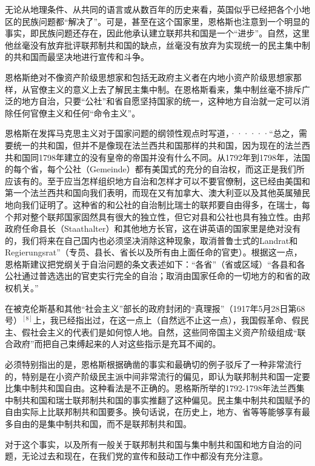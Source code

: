 无论从地理条件、从共同的语言或从数百年的历史来看，英国似乎已经把各个小地区的民族问题都“解决了”。可是，甚至在这个国家里，恩格斯也注意到一个明显的事实，即民族问题还存在，因此他承认建立联邦共和国是一个“进步”。自然，这里他丝毫没有放弃批评联邦制共和国的缺点，丝毫没有放弃为实现统一的民主集中制的共和国而最坚决地进行宣传和斗争。

恩格斯绝对不像资产阶级思想家和包括无政府主义者在内地小资产阶级思想家那样，从官僚主义的意义上去了解民主集中制。在恩格斯看来，集中制丝毫不排斥广泛的地方自治，只要“公社”和省自愿坚持国家的统一，这种地方自治就一定可以消除任何官僚主义和任何“命令主义”。

\pskip
\small
\leftskip=10mm

恩格斯在发挥马克思主义对于国家问题的纲领性观点时写道，······“总之，需要统一的共和国，但并不是像现在法兰西共和国那样的共和国，因为现在的法兰西共和国同1798年建立的没有皇帝的帝国并没有什么不同。从1792年到1798年，法国的每个省，每个公社（Gemeinde）都有美国式的充分的自治权，而这正是我们所应该有的。至于应当怎样组织地方自治和怎样才可以不要官僚制，这已经由美国和第一个法兰西共和国向我们表明，而现在又有加拿大、澳大利亚以及其他英属殖民地向我们证明了。这种省的和公社的自治制比瑞士的联邦要自由得多，在瑞士，每个邦对整个联邦国家固然具有很大的独立性，但它对县和公社也具有独立性。由邦政府任命县长（Staathalter）和其他地方长官，这在讲英语的国家里是绝对没有的，我们将来在自己国内也必须坚决消除这种现象，取消普鲁士式的Landrat和Regierungsrat”（专员、县长、省长以及所有由上面任命的官吏）。根据这一点，恩格斯建议把党纲关于自治问题的条文表述如下：“各省”（省或区域）“各县和各公社通过普选选出的官吏实行完全的自治；取消由国家任命的一切地方的和省的政权机关。”

\normalsize
\leftskip=0mm
\pskip

在被克伦斯基和其他“社会主义”部长的政府封闭的“真理报”（1917年5月28日第68号）$^{[8]}$上，我已经指出过，在这一点上（自然远不止这一点），我国假革命、假民主、假社会主义的代表们是如何惊人地。自然，这些同帝国主义资产阶级组成“联合政府”而把自己束缚起来的人对这些指示是充耳不闻的。

必须特别指出的是，恩格斯根据确凿的事实和最确切的例子驳斥了一种非常流行的，特别是在小资产阶级民主派中间非常流行的偏见，即认为联邦制共和国一定要比集中制共和国自由。这种看法是不正确的。恩格斯所举的1792-1798年法兰西集中制共和国和瑞士联邦制共和国的事实推翻了这种偏见。民主集中制共和国赋予的自由实际上比联邦制共和国要{\kaishu 多}。换句话说，在历史上，地方、省等等能够享有{\kaishu 最多}自由的是{\kaishu 集中制}共和国，而不是联邦制共和国。

对于这个事实，以及所有一般关于联邦制共和国与集中制共和国和地方自治的问题，无论过去和现在，在我们党的宣传和鼓动工作中都没有充分注意。